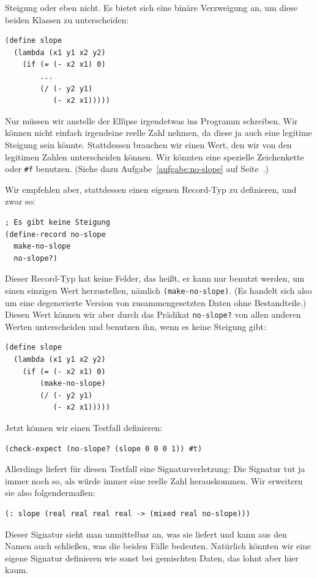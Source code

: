Steigung oder eben nicht.  Es bietet sich eine binäre Verzweigung an,
um diese beiden Klassen zu unterscheiden:
%
\begin{lstlisting}
(define slope
  (lambda (x1 y1 x2 y2)
    (if (= (- x2 x1) 0)
        ...
        (/ (- y2 y1)
           (- x2 x1))))) 
\end{lstlisting}
%
Nur müssen wir anstelle der Ellipse irgendetwas ins Programm
schreiben.  Wir können nicht einfach irgendeine reelle Zahl nehmen, da
diese ja auch eine legitime Steigung sein könnte.  Stattdessen
brauchen wir einen Wert, den wir von den legitimen Zahlen
unterscheiden können.  Wir könnten eine spezielle Zeichenkette oder
\lstinline{#f} benutzen.  (Siehe dazu Aufgabe~\ref{aufgabe:no-slope}
auf Seite~\pageref{aufgabe:no-slope}.)

Wir empfehlen aber, stattdessen einen eigenen Record-Typ zu
definieren, und zwar so:
%
\begin{lstlisting}
; Es gibt keine Steigung
(define-record no-slope
  make-no-slope
  no-slope?)
\end{lstlisting}
%
Dieser Record-Typ hat keine Felder, das heißt, er kann nur benutzt
werden, um einen einzigen Wert herzustellen, nämlich
\lstinline{(make-no-slope)}.  (Es handelt sich also um eine
degenerierte Version von zusammengesetzten Daten ohne Bestandteile.)
Diesen Wert können wir aber durch das Prädikat \lstinline{no-slope?}
von allen anderen Werten unterscheiden und benutzen ihn, wenn es keine
Steigung gibt:
%
\begin{lstlisting}
(define slope
  (lambda (x1 y1 x2 y2)
    (if (= (- x2 x1) 0)
        (make-no-slope)
        (/ (- y2 y1)
           (- x2 x1)))))
\end{lstlisting}
%
Jetzt können wir einen Testfall definieren:
%
\begin{lstlisting}
(check-expect (no-slope? (slope 0 0 0 1)) #t)
\end{lstlisting}
%
Allerdings liefert \drscheme{} für diesen Testfall eine
Signaturverletzung: Die Signatur tut ja immer noch so, als würde immer
eine reelle Zahl herauskommen.  Wir erweitern sie also folgendermaßen:
%
\begin{lstlisting}
(: slope (real real real real -> (mixed real no-slope)))
\end{lstlisting}
%
Dieser Signatur sieht man unmittelbar an, was sie liefert und kann aus
den Namen auch schließen, was die beiden Fälle bedeuten.  Natürlich
könnten wir eine eigene Signatur definieren wie sonst bei gemischten
Daten, das lohnt aber hier kaum.

